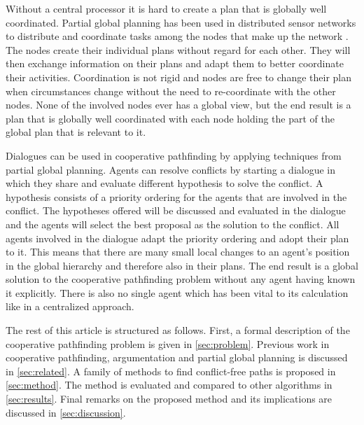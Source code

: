 Without a central processor it is hard to create a plan that is globally well
coordinated. Partial global planning has been used in distributed sensor 
networks to distribute and coordinate tasks among the nodes that make up the 
network \citep{durfee1991}. The nodes create their individual plans without 
regard for each other. They will then exchange information on their plans and 
adapt them to better coordinate their activities. Coordination is not rigid and 
nodes are free to change their plan when circumstances change 
without the need to re-coordinate with the other nodes. None of the involved 
nodes ever has a global view, but the end result is a plan that is globally well
coordinated with each node holding the part of the global plan that is relevant 
to it.

Dialogues can be used in cooperative pathfinding by applying techniques from
partial global planning. Agents can resolve conflicts by starting a dialogue in 
which they share and evaluate different hypothesis to solve the conflict. A
hypothesis consists of a priority ordering for the agents that are involved in
the conflict. The hypotheses offered will be discussed and evaluated in the
dialogue and the agents will select the best proposal as the solution 
to the conflict. All agents involved in the dialogue adapt the priority 
ordering and adopt their plan to it. This means that there are many small local 
changes to an agent's position in the global hierarchy and therefore also in 
their plans. The end result is a global solution to the cooperative pathfinding 
problem without any agent having known it explicitly. There is also no single 
agent which has been vital to its calculation like in a centralized approach.

The rest of this article is structured as follows. First, a formal description
of the cooperative pathfinding problem is given in \autoref{sec:problem}.
Previous work in cooperative pathfinding, argumentation and partial global
planning is discussed in \autoref{sec:related}. A family of methods to find
conflict-free paths is proposed in \autoref{sec:method}. The method is
evaluated and compared to other algorithms in \autoref{sec:results}. Final
remarks on the proposed method and its implications are discussed in
\autoref{sec:discussion}.
